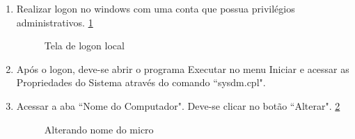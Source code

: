 \begin{enumerate}
	\item {Realizar logon no windows com uma conta que possua privilégios administrativos. \ref{logon_local_adm}}
	\begin{figure}[ht]
   			\centering
   			\caption{Tela de logon local}
    		\label{logon_local_adm}
	\end{figure}

	\item {Após o logon, deve-se abrir o programa Executar no menu Iniciar e acessar as Propriedades do Sistema através do comando ``sysdm.cpl".}

	\item {Acessar a aba ``Nome do Computador". Deve-se clicar no botão ``Alterar". \ref{alterar_nome_micro}}

		\begin{figure}[ht]
	   			\centering
	   			\caption{Alterando nome do micro}
	    		\label{alterar_nome_micro}
		\end{figure}
		 
		\pagebreak 


\end{enumerate}
